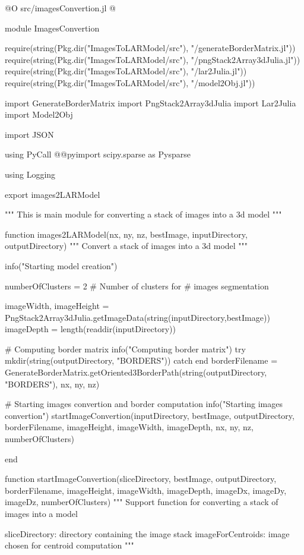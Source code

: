 \documentclass[11pt,oneside]{article}	%
\begin{document}
@O src/imagesConvertion.jl
@{module ImagesConvertion

require(string(Pkg.dir("ImagesToLARModel/src"), "/generateBorderMatrix.jl"))
require(string(Pkg.dir("ImagesToLARModel/src"), "/pngStack2Array3dJulia.jl"))
require(string(Pkg.dir("ImagesToLARModel/src"), "/lar2Julia.jl"))
require(string(Pkg.dir("ImagesToLARModel/src"), "/model2Obj.jl"))

import GenerateBorderMatrix
import PngStack2Array3dJulia
import Lar2Julia
import Model2Obj

import JSON

using PyCall
@@pyimport scipy.sparse as Pysparse

using Logging

export images2LARModel

"""
This is main module for converting a stack
of images into a 3d model
"""

function images2LARModel(nx, ny, nz, bestImage, inputDirectory, outputDirectory)
  """
  Convert a stack of images into a 3d model
  """

  info("Starting model creation")

  numberOfClusters = 2 # Number of clusters for
                       # images segmentation

  imageWidth, imageHeight = PngStack2Array3dJulia.getImageData(string(inputDirectory,bestImage))
  imageDepth = length(readdir(inputDirectory))

  # Computing border matrix
  info("Computing border matrix")
  try
    mkdir(string(outputDirectory, "BORDERS"))
  catch
  end
  borderFilename = GenerateBorderMatrix.getOriented3BorderPath(string(outputDirectory, "BORDERS"), nx, ny, nz)

  # Starting images convertion and border computation
  info("Starting images convertion")
  startImageConvertion(inputDirectory, bestImage, outputDirectory, borderFilename,
                       imageHeight, imageWidth, imageDepth,
                       nx, ny, nz,
                       numberOfClusters)

end


function startImageConvertion(sliceDirectory, bestImage, outputDirectory, borderFilename,
                              imageHeight, imageWidth, imageDepth,
                              imageDx, imageDy, imageDz,
                              numberOfClusters)
  """
  Support function for converting a stack of images into a model

  sliceDirectory: directory containing the image stack
  imageForCentroids: image chosen for centroid computation
  """

}
\end{document}

